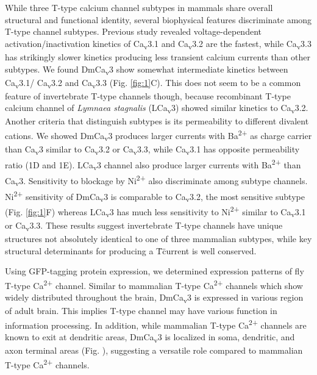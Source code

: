 While three T-type calcium channel subtypes in mammals share overall structural and functional identity, several biophysical features discriminate among T-type channel subtypes.
Previous study revealed voltage-dependent activation/inactivation kinetics of Ca\textsubscript{v}3.1 and Ca\textsubscript{v}3.2 are the fastest, while Ca\textsubscript{v}3.3 has strikingly slower kinetics producing less transient calcium currents than other subtypes\cite{lee:1999aa,klockner:1999aa}.
We found DmCa\textsubscript{v}3 show somewhat intermediate kinetics between Ca\textsubscript{v}3.1/ Ca\textsubscript{v}3.2 and Ca\textsubscript{v}3.3 (Fig. \ref{fig:1}C).
This does not seem to be a common feature of invertebrate T-type channels though, because recombinant T-type calcium channel of \emph{Lymnaea stagnalis} (LCa\textsubscript{v}3) showed similar kinetics to Ca\textsubscript{v}3.2\cite{senatore:2010aa}.
Another criteria that distinguish subtypes is its permeability to different divalent cations\cite{mcrory:2000aa,shcheglovitov:2007aa}.
We showed DmCa\textsubscript{v}3 produces larger currents with Ba\textsuperscript{2+} as charge carrier than Ca\textsubscript{v}3 similar to Ca\textsubscript{v}3.2 or Ca\textsubscript{v}3.3, while Ca\textsubscript{v}3.1 has opposite permeability ratio (1D and 1E).
LCa\textsubscript{v}3 channel also produce larger currents with Ba\textsuperscript{2+} than Ca\textsubscript{v}3\cite{senatore:2010aa}.
Sensitivity to blockage by Ni\textsuperscript{2+} also discriminate among subtype channels.
Ni\textsuperscript{2+} sensitivity of DmCa\textsubscript{v}3 is comparable to Ca\textsubscript{v}3.2, the most sensitive subtype (Fig. \ref{fig:1}F) whereas LCa\textsubscript{v}3 has much less sensitivity to Ni\textsuperscript{2+} similar to Ca\textsubscript{v}3.1 or Ca\textsubscript{v}3.3\cite{senatore:2010aa}.
These results suggest invertebrate T-type channels have unique structures not absolutely identical to one of three mammalian subtypes, while key structural determinants for producing a \"T\" current is well conserved.

Using GFP-tagging protein expression, we determined expression patterns of fly T-type Ca\textsuperscript{2+} channel.
Similar to mammalian T-type Ca\textsuperscript{2+} channels which show widely distributed throughout the brain\cite{talley:1999aa}, DmCa\textsubscript{v}3 is expressed in various region of adult brain.
This implies T-type channel may have various function in information processing.
In addition, while mammalian T-type Ca\textsuperscript{2+} channels are known to exit at dendritic areas, DmCa\textsubscript{v}3 is localized in soma, dendritic, and axon terminal areas (Fig. ), suggesting a versatile role compared to mammalian T-type Ca\textsuperscript{2+} channels. 

